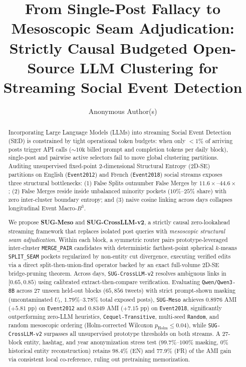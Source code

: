\documentclass[preprint,12pt,authoryear]{elsarticle}
\begin{document}
\begin{frontmatter}

\title{From Single-Post Fallacy to Mesoscopic Seam Adjudication: Strictly Causal Budgeted Open-Source LLM Clustering for Streaming Social Event Detection}

\author[inst1]{Anonymous Author(s)}

\begin{abstract}
Incorporating Large Language Models (LLMs) into streaming Social Event Detection (SED) is constrained by tight operational token budgets: when only $<1\%$ of arriving posts trigger API calls ($\sim 10\text{k}$ billed prompt and completion tokens per daily block), single-post and pairwise active selectors fail to move global clustering partitions. Auditing unsupervised fixed-point 2-dimensional Structural Entropy (2D-SE) partitions on English (\texttt{Event2012}) and French (\texttt{Event2018}) social streams exposes three structural bottlenecks: (1) False Splits outnumber False Merges by $11.6\times$--$44.6\times$; (2) False Merges reside inside unbalanced minority pockets ($10\%$--$25\%$ share) with zero inter-cluster boundary entropy; and (3) naive cosine linking across days collapses longitudinal Event Macro-$B^3$.

We propose \textbf{SUG-Meso} and \textbf{SUG-CrossLLM-v2}, a strictly causal zero-lookahead streaming framework that replaces isolated post queries with \emph{mesoscopic structural seam adjudication}. Within each block, a symmetric router pairs prototype-leveraged inter-cluster \texttt{MERGE\_PAIR} candidates with deterministic farthest-point spherical $k$-means \texttt{SPLIT\_SEAM} pockets regularized by non-entity cut divergence, executing verified edits via a direct split-then-union-find operator backed by an exact full-volume 2D-SE bridge-pruning theorem. Across days, \texttt{SUG-CrossLLM-v2} resolves ambiguous links in $[0.65, 0.85)$ using calibrated extract-then-compare verification. Evaluating \texttt{Qwen/Qwen3-8B} across $27$ unseen held-out blocks ($65{,}856$ tweets) with strict prompt-shown masking (uncontaminated $U_t$, $1.79\%$--$3.78\%$ total exposed posts), \texttt{SUG-Meso} achieves $0.8976$ AMI ($+5.81\text{ pp}$) on \texttt{Event2012} and $0.8349$ AMI ($+7.15\text{ pp}$) on \texttt{Event2018}, significantly outperforming zero-LLM heuristics, \texttt{Cequel-Transitive}, multi-seed \texttt{Random}, and random mesoscopic ordering (Holm-corrected Wilcoxon $p_{\text{Holm}} \le 0.04$), while \texttt{SUG-CrossLLM-v2} surpasses all unsupervised prototype thresholds on both streams. A 27-block entity, hashtag, and year anonymization stress test ($99.7\%$--$100\%$ masking, $0\%$ historical entity reconstruction) retains $98.4\%$ (EN) and $77.9\%$ (FR) of the AMI gain via consistent local co-reference, ruling out pretraining memorization.
\end{abstract}


\end{frontmatter}
\end{document}
